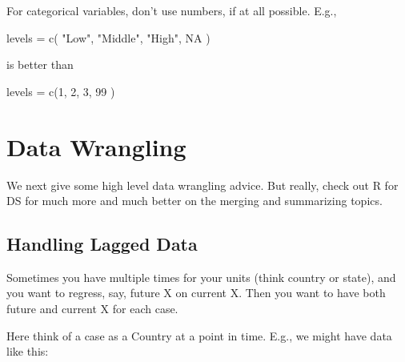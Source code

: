 \documentclass[
  letterpaper,
  DIV=11,
  numbers=noendperiod]{scrreprt}
\newenvironment{Shaded}{}{}
\newcommand{\AttributeTok}[1]{\textcolor[rgb]{0.49,0.56,0.16}{#1}}
\newcommand{\ConstantTok}[1]{\textcolor[rgb]{0.53,0.00,0.00}{#1}}
\newcommand{\DecValTok}[1]{\textcolor[rgb]{0.25,0.63,0.44}{#1}}
\newcommand{\FunctionTok}[1]{\textcolor[rgb]{0.02,0.16,0.49}{#1}}
\newcommand{\NormalTok}[1]{#1}
\newcommand{\OtherTok}[1]{\textcolor[rgb]{0.00,0.44,0.13}{#1}}
\newcommand{\SpecialCharTok}[1]{\textcolor[rgb]{0.25,0.44,0.63}{#1}}
\newcommand{\StringTok}[1]{\textcolor[rgb]{0.25,0.44,0.63}{#1}}
\begin{document}
For categorical variables, don't use numbers, if at all possible. E.g.,

\begin{Shaded}
\begin{Highlighting}[]
\NormalTok{levels }\OtherTok{=} \FunctionTok{c}\NormalTok{( }\StringTok{"Low"}\NormalTok{, }\StringTok{"Middle"}\NormalTok{, }\StringTok{"High"}\NormalTok{, }\ConstantTok{NA}\NormalTok{ )}
\end{Highlighting}
\end{Shaded}

is better than

\begin{Shaded}
\begin{Highlighting}[]
\NormalTok{levels }\OtherTok{=} \FunctionTok{c}\NormalTok{(}\DecValTok{1}\NormalTok{, }\DecValTok{2}\NormalTok{, }\DecValTok{3}\NormalTok{, }\DecValTok{99}\NormalTok{ )}
\end{Highlighting}
\end{Shaded}

\section{Data Wrangling}\label{data-wrangling}

We next give some high level data wrangling advice. But really, check
out R for DS for much more and much better on the merging and
summarizing topics.

\subsection{Handling Lagged Data}\label{handling-lagged-data}

Sometimes you have multiple times for your units (think country or
state), and you want to regress, say, future X on current X. Then you
want to have both future and current X for each case.

Here think of a case as a Country at a point in time. E.g., we might
have data like this:

\begin{Shaded}
\end{Shaded}
\end{document}
